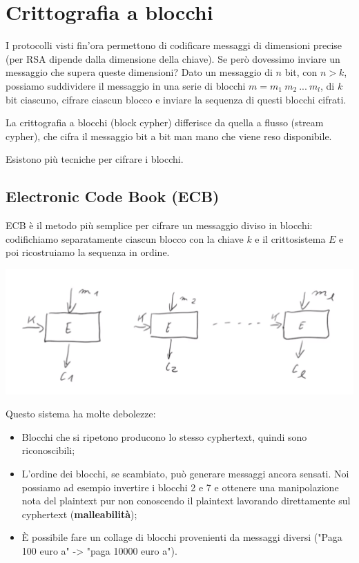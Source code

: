 \chapter{Crittografia a blocchi}
\label{chapter5}

I protocolli visti fin'ora permettono di codificare messaggi di dimensioni precise (per RSA dipende dalla dimensione della chiave). Se però dovessimo inviare un messaggio che supera queste dimensioni? Dato un messaggio di $n$ bit, con $n > k$, possiamo suddividere il messaggio in una serie di blocchi $m = m_1 \ m_2 \ ... \ m_l$, di $k$ bit ciascuno, cifrare ciascun blocco e inviare la sequenza di questi blocchi cifrati. 

La crittografia a blocchi (block cypher) differisce da quella  a flusso (stream cypher), che cifra il messaggio bit a bit man mano che viene reso disponibile.

Esistono più tecniche per cifrare i blocchi.

\section{Electronic Code Book (ECB)}

ECB è il metodo più semplice per cifrare un messaggio diviso in blocchi: codifichiamo separatamente ciascun blocco con la chiave $k$ e il crittosistema $E$ e poi ricostruiamo la sequenza in ordine.

\begin{center}
    \includegraphics[width=1\textwidth]{images/ECB.png}
\end{center}

\noindent Questo sistema ha molte debolezze:
\begin{itemize}
    \item Blocchi che si ripetono producono lo stesso cyphertext, quindi sono riconoscibili;
    \item L'ordine dei blocchi, se scambiato, può generare messaggi ancora sensati. Noi possiamo ad esempio invertire i blocchi 2 e 7 e ottenere una manipolazione nota del plaintext pur non conoscendo il plaintext lavorando direttamente sul cyphertext (\textbf{malleabilità});
    \item È possibile fare un collage di blocchi provenienti da messaggi diversi ("Paga 100 euro a" -> "paga 10000 euro a").
\end{itemize}


